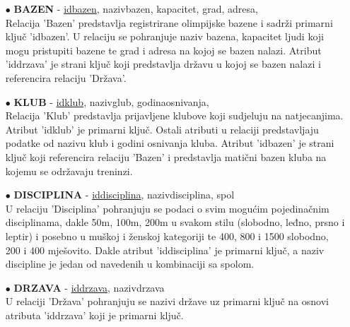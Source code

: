 \documentclass[times, utf8, zavrsni]{fer}
\begin{document}
\begin{itemize}
\vspace{\baselineskip}

    \item[$\bullet$] \textbf{BAZEN} - \underline{idbazen}, nazivbazen, kapacitet, grad, adresa,  \\
    Relacija 'Bazen' predstavlja registrirane olimpijske bazene i sadrži primarni ključ 'idbazen'. U relaciju se pohranjuje naziv bazena, kapacitet ljudi 
    koji mogu pristupiti bazene te grad i adresa na kojoj se bazen nalazi. Atribut 'iddrzava' je strani ključ koji predstavlja državu u kojoj se bazen nalazi i 
    referencira relaciju 'Država'.

\vspace{\baselineskip}

    \item[$\bullet$] \textbf{KLUB} - \underline{idklub}, nazivglub, godinaosnivanja,  \\
    Relacija 'Klub' predstavlja prijavljene klubove koji sudjeluju na natjecanjima. Atribut 'idklub' je primarni ključ. Ostali atributi u relaciji predstavljaju
    podatke od nazivu klub i godini osnivanja kluba. Atribut 'idbazen' je strani ključ koji referencira relaciju 'Bazen' i predstavlja matični bazen kluba na kojemu
    se održavaju treninzi. 

\vspace{\baselineskip}

    \item[$\bullet$] \textbf{DISCIPLINA} - \underline{iddisciplina}, nazivdisciplina, spol \\
    U relaciju 'Disciplina' pohranjuju se podaci o svim mogućim pojedinačnim disciplinama, dakle 50m, 100m, 200m u svakom stilu (slobodno, leđno, prsno i leptir) i posebno u
    muškoj i ženskoj kategoriji te 400, 800 i 1500 slobodno, 200 i 400 mješovito. Dakle atribut 'iddisciplina' je primarni ključ, a naziv discipline je jedan od navedenih u kombinaciji
    sa spolom.

\vspace{\baselineskip}

    \item[$\bullet$] \textbf{DRZAVA} - \underline{iddrzava}, nazivdrzava \\
    U relaciji 'Država' pohranjuju se nazivi države uz primarni ključ na osnovi atributa 'iddrzava' koji je primarni ključ.

\vspace{\baselineskip}


\end{itemize}
\end{document}
